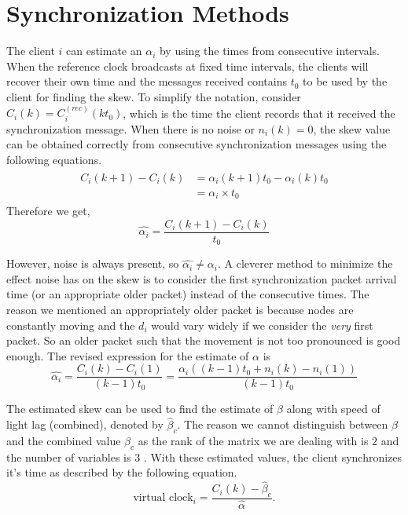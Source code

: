 \documentclass[10pt, journal, letter, onecolumn]{IEEEtran}
\begin{document}
\section{Synchronization Methods}
\label{sec:methods}
The client $i$ can estimate an $\alpha_i$ by using the times from consecutive intervals. When the reference clock broadcasts at fixed time intervals, the clients will recover their own time and the messages received contains $t_0$ to be used by the client for finding the skew. To simplify the notation, consider $C_i(k) = C^{(rec)}_i(kt_0)$, which is the time the client records that it received the synchronization message.
When there is no noise or $n_i(k) = 0$, the skew value can be obtained correctly from consecutive synchronization messages using the following equations.
\begin{eqnarray*}
\begin{aligned}
C_i(k+1) - C_i(k) &= \alpha_i (k+1) t_0 - \alpha_i (k) t_0\\
&= \alpha_i \times t_0
\end{aligned}
\end{eqnarray*}
Therefore we get,
$$\hat{\alpha_i} = \frac{C_i(k+1) - C_i(k)}{t_0} $$

However, noise is always present, so $\hat{\alpha_i} \neq \alpha_i$. A cleverer method to minimize the effect noise has on the skew is to consider the first synchronization packet arrival time (or an appropriate older packet) instead of the consecutive times. The reason we mentioned an appropriately older packet is because nodes are constantly moving and the $d_i$ would vary widely if we consider the \emph{very} first packet. So an older packet such that the movement is not too pronounced is good enough. The revised expression for the estimate of $\alpha$ is
\[
\hat{\alpha_i} = \frac{C_i(k) - C_i(1)}{(k - 1) t_0} = \frac{\alpha_i ( (k-1) t_0 + n_i(k) - n_i(1) ) }{(k - 1) t_0}
\]

The estimated skew can be used to find the estimate of $\beta$ along with speed of light lag (combined), denoted by $\hat{\beta}_c$. The reason we cannot distinguish between $\beta$ and the combined value $\beta_c$ as the rank of the matrix we are dealing with is $2$ and the number of variables is $3$ \cite{freris2010fundamentals, freris2007fundamental, giridhar2006distributed, freris2011fundamental}. With these estimated values, the client synchronizes it's time as described by the following equation.
\[
\text{virtual clock}_i = \frac{C_i(k) - \hat{\beta}_{c}}{\hat{\alpha}}.
\]
\end{document}
